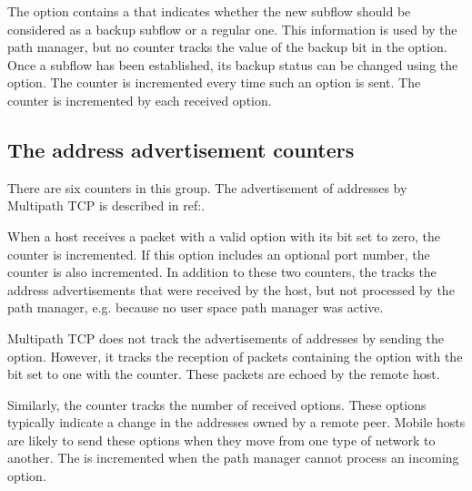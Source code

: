 \documentclass[letterpaper,10pt,english]{sphinxmanual}
\begin{document}
\sphinxAtStartPar
The  option contains a  that indicates whether the new
subflow should be considered as a backup subflow or a regular one. This
information is used by the path manager, but no counter tracks the value of
the backup bit in the  option. Once a subflow has been established,
its backup status can be changed using the  option. The
 counter is incremented every time such an option is sent.
The  counter is incremented by each received 
option.


\subsection{The address advertisement counters}
\label{\detokenize{mptcp-linux:the-address-advertisement-counters}}
\sphinxAtStartPar
There are six counters in this group. The advertisement of addresses by
Multipath TCP is described in ref:.

\sphinxAtStartPar
When a host receives a packet with a valid  option with its
 bit set to zero, the  counter is incremented.
If this option includes an optional port number, the 
counter is also incremented. In addition to these two counters, the
 tracks the address advertisements that were received
by the host, but not processed by the path manager, e.g. because no user
space path manager was active.

\sphinxAtStartPar
Multipath TCP does not track the advertisements of addresses by sending
the  option. However, it tracks the reception of packets
containing the  option with the  bit set to one with
the  counter. These packets are echoed by the remote host.

\sphinxAtStartPar
Similarly, the  counter tracks the number of received
 options. These options typically indicate a change in the
addresses owned by a remote peer. Mobile hosts are likely to send these
options when they move from one type of network to another. The
 is incremented when the path manager cannot process an
incoming  option.
\end{document}
